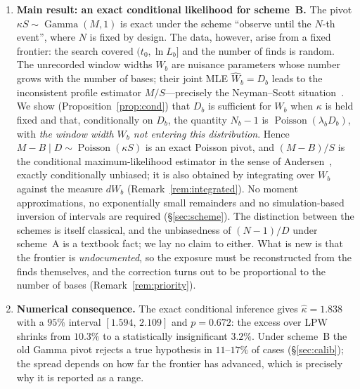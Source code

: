 \documentclass[11pt,a4paper]{article}
\theoremstyle{plain}
\theoremstyle{remark}
\DeclareMathOperator{\Gam}{Gamma}
\DeclareMathOperator{\Pois}{Poisson}
\begin{document}
\begin{enumerate}
\item\textbf{Main result: an exact conditional likelihood for scheme~B.} The
pivot $\kappa S\sim\Gam(M,1)$ is exact under the scheme ``observe until the
$N$-th event'', where $N$ is fixed by design. The data, however, arise from a
fixed frontier: the search covered $(t_0,\ln L_b]$ and the number of finds is
random. The unrecorded window widths $W_b$ are nuisance parameters whose number
grows with the number of bases; their joint MLE $\hat W_b=D_b$ leads to the
inconsistent profile estimator $M/S$---precisely the Neyman--Scott
situation~\cite{neymanscott1948}. We show (Proposition~\ref{prop:cond}) that
$D_b$ is sufficient for $W_b$ when $\kappa$ is held fixed and that,
conditionally on $D_b$, the quantity $N_b-1$ is $\Pois(\lambda_bD_b)$, with
\emph{the window width $W_b$ not entering this distribution}. Hence
$M-B\mid D\sim\Pois(\kappa S)$ is an exact Poisson pivot, and $(M-B)/S$ is the
conditional maximum-likelihood estimator in the sense of
Andersen~\cite{andersen1970}, exactly conditionally unbiased; it is also
obtained by integrating over $W_b$ against the measure $dW_b$
(Remark~\ref{rem:integrated}). No moment approximations, no exponentially small
remainders and no simulation-based inversion of intervals are required
(\S\ref{sec:scheme}). The distinction between the schemes is itself classical,
and the unbiasedness of $(N-1)/D$ under scheme~A is a textbook fact; we lay no
claim to either. What is new is that the frontier is \emph{undocumented}, so the
exposure must be reconstructed from the finds themselves, and the correction
turns out to be proportional to the number of bases
(Remark~\ref{rem:priority}).

\item\textbf{Numerical consequence.} The exact conditional inference gives
$\hat\kappa=1.838$ with a $95\%$ interval $[1.594,\,2.109]$ and $p=0.672$: the
excess over LPW shrinks from $10.3\%$ to a statistically insignificant $3.2\%$.
Under scheme~B the old Gamma pivot rejects a true
hypothesis in $11$--$17\%$ of cases (\S\ref{sec:calib}); the spread depends on
how far the frontier has advanced, which is precisely why it is reported as a
range.


\end{enumerate}
\end{document}
